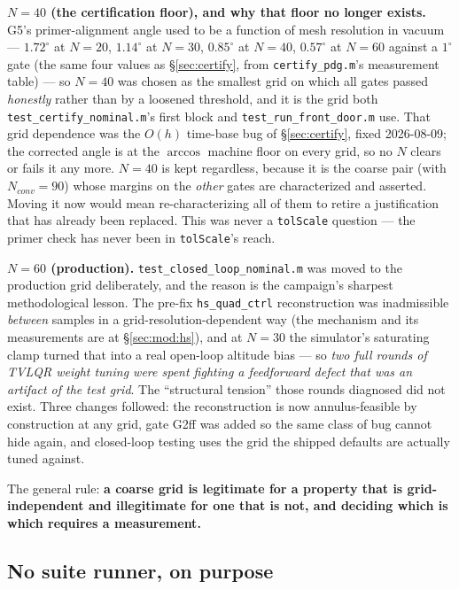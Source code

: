 \documentclass[11pt]{article}
\newcommand{\file}[1]{\texttt{#1}}
\begin{document}
\textbf{$N=40$ (the certification floor), and why that floor no longer
exists.} G5's primer-alignment angle used to be a function of mesh
resolution in vacuum --- $1.72^\circ$ at $N=20$, $1.14^\circ$ at
$N=30$, $0.85^\circ$ at $N=40$, $0.57^\circ$ at $N=60$ against a $1^\circ$
gate (the same four values as \S\ref{sec:certify}, from
\texttt{certify\_pdg.m}'s measurement table) --- so $N=40$ was chosen as
the smallest grid on which all gates passed
\emph{honestly} rather than by a loosened threshold, and it is the grid both
\file{test\_certify\_nominal.m}'s first block and
\file{test\_run\_front\_door.m} use. That grid dependence was the $O(h)$
time-base bug of \S\ref{sec:certify}, fixed 2026-08-09; the corrected angle
is at the $\arccos$ machine floor on every grid, so no $N$ clears or fails
it any more. $N=40$ is kept regardless, because it is the coarse pair
(with $N_{conv}=90$) whose margins on the \emph{other} gates are
characterized and asserted. Moving it now would mean re-characterizing all
of them to retire a justification that has already been replaced. This was
never a \texttt{tolScale} question --- the primer check has never been in
\texttt{tolScale}'s reach.

\textbf{$N=60$ (production).} \file{test\_closed\_loop\_nominal.m} was moved
to the production grid deliberately, and the reason is the campaign's
sharpest methodological lesson. The pre-fix \texttt{hs\_quad\_ctrl}
reconstruction was inadmissible \emph{between} samples in a
grid-resolution-dependent way (the mechanism and its measurements are at
\S\ref{sec:mod:hs}), and at $N=30$ the simulator's saturating clamp turned
that into a real open-loop altitude bias --- so \emph{two full rounds of
TVLQR weight tuning were spent fighting a feedforward defect that was an
artifact of the test grid}. The ``structural tension'' those rounds
diagnosed did not exist. Three changes followed: the reconstruction is now
annulus-feasible by construction at any grid, gate G2ff was added so the
same class of bug cannot hide again, and closed-loop testing uses the grid
the shipped defaults are actually tuned against.

The general rule: \textbf{a coarse grid is legitimate for a property that is
grid-independent and illegitimate for one that is not, and deciding which is
which requires a measurement.}

\subsection{No suite runner, on purpose}
\label{sec:tests:runner}
\end{document}
